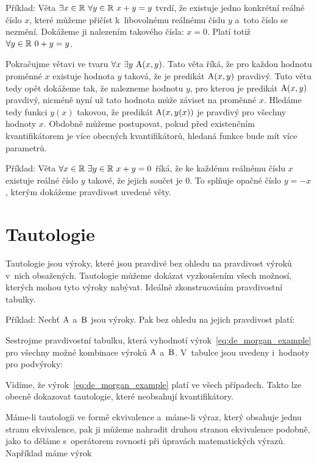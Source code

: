Příklad: Věta \(\exists x \in \real \ \forall y \in \real \ x + y = y\) tvrdí, že existuje jedno konkrétní reálné číslo \(x\), které můžeme přičíst k~libovolnému reálnému číslu \(y\) a~toto číslo se nezmění. Dokážeme ji nalezením takového čísla: \(x = 0\). Platí totiž \(\forall y \in \mathbb{R} \ 0 + y = y\).

Pokračujme větavi ve tvaru \(\forall x \ \exists y \ \predicate{A}(x, y)\). Tato věta říká, že pro každou hodnotu proměnné \(x\) existuje hodnota \(y\) taková, že je predikát \(\mathrm{A}(x, y)\) pravdivý. Tuto větu tedy opět dokážeme tak, že nalezneme hodnotu \(y\), pro kterou je predikát \(\mathrm{A}(x, y)\) pravdivý, nicméně nyní už tato hodnota může záviset na proměnné \(x\). Hledáme tedy funkci \(y(x)\) takovou, že predikát \(\mathrm{A}(x, y(x))\) je pravdivý pro všechny hodnoty \(x\). Obdobně můžeme postupovat, pokud před existenčním kvantifikátorem je více obecných kvantifikátorů, hledaná funkce bude mít více parametrů.

Příklad: Věta \(\forall x \in \real \ \exists y \in \real \ x + y = 0\) říká, že ke každému reálnému číslu \(x\) existuje reálné číslo \(y\) takové, že jejich součet je 0. To splňuje opačné číslo \(y = -x\), kterým dokážeme pravdivost uvedené věty.

\section{Tautologie}

Tautologie jsou výroky, které jsou pravdivé bez ohledu na pravdivost výroků v~nich obsažených. Tautologie můžeme dokázat vyzkoušením všech možnosí, kterých mohou tyto výroky nabývat. Ideálně zkonstruováním pravdivostní tabulky.

Příklad: Nechť \(\mathrm{A}\) a~\(\mathrm{B}\) jsou výroky. Pak bez ohledu na jejich pravdivost platí:


Sestrojme pravdivostní tabulku, která vyhodnotí výrok~\eqref{eq:de_morgan_example} pro všechny možné kombinace výroků \(\mathrm{A}\) a~\(\mathrm{B}\). V~tabulce jsou uvedeny i~hodnoty pro podvýroky:


Vidíme, že výrok~\eqref{eq:de_morgan_example} platí ve všech případech. Takto lze obecně dokazovat tautologie, které neobsahují kvantifikátory.

Máme-li tautologii ve formě ekvivalence a~máme-li výraz, který obsahuje jednu stranu ekvivalence, pak ji můžeme nahradit druhou stranou ekvivalence podobně, jako to děláme s~operátorem rovnosti při úpravách matematických výrazů. Například máme výrok

